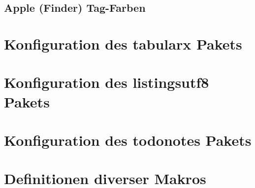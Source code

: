 \documentclass[a4paper,12pt]{article}
\begin{document}
				\subsection{Apple (Finder) Tag-Farben}
					
			\section{Konfiguration des tabularx Pakets}
				
			\section{Konfiguration des listingsutf8 Pakets}
				
			\section{Konfiguration des todonotes Pakets}
				
			\section{Definitionen diverser Makros}
				



		\printindex


		\appendix

		
\end{document}
